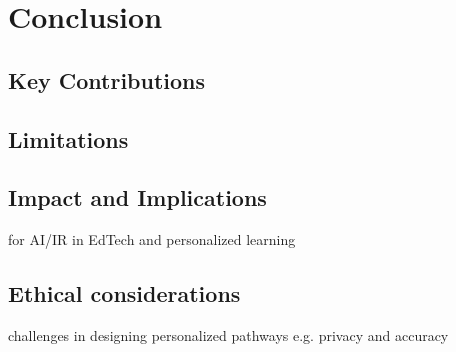 \chapter{Conclusion} \label{chap:chap-7}



\section{Key Contributions}

\section{Limitations}

\section{Impact and Implications}

for AI/IR in EdTech and personalized learning 

\section{Ethical considerations}
challenges in designing personalized pathways e.g. privacy and accuracy 